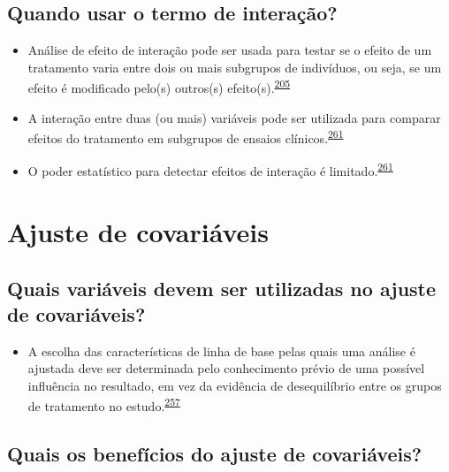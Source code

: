 \documentclass[
  a4paper,
]{book}
\providecommand{\tightlist}{%
  \setlength{\itemsep}{0pt}\setlength{\parskip}{0pt}}
\begin{document}
\hypertarget{quando-usar-o-termo-de-interauxe7uxe3o}{%
\subsection{Quando usar o termo de interação?}\label{quando-usar-o-termo-de-interauxe7uxe3o}}

\begin{itemize}
\item
  Análise de efeito de interação pode ser usada para testar se o efeito de um tratamento varia entre dois ou mais subgrupos de indivíduos, ou seja, se um efeito é modificado pelo(s) outros(s) efeito(s).\textsuperscript{\protect\hyperlink{ref-Altman1996}{205}}
\item
  A interação entre duas (ou mais) variáveis pode ser utilizada para comparar efeitos do tratamento em subgrupos de ensaios clínicos.\textsuperscript{\protect\hyperlink{ref-Altman2003}{261}}
\item
  O poder estatístico para detectar efeitos de interação é limitado.\textsuperscript{\protect\hyperlink{ref-Altman2003}{261}}
\end{itemize}

\hypertarget{ajuste-de-covariaveis}{%
\section{Ajuste de covariáveis}\label{ajuste-de-covariaveis}}

\hypertarget{quais-variuxe1veis-devem-ser-utilizadas-no-ajuste-de-covariuxe1veis}{%
\subsection{Quais variáveis devem ser utilizadas no ajuste de covariáveis?}\label{quais-variuxe1veis-devem-ser-utilizadas-no-ajuste-de-covariuxe1veis}}

\begin{itemize}
\tightlist
\item
  A escolha das características de linha de base pelas quais uma análise é ajustada deve ser determinada pelo conhecimento prévio de uma possível influência no resultado, em vez da evidência de desequilíbrio entre os grupos de tratamento no estudo.\textsuperscript{\protect\hyperlink{ref-roberts1999}{257}}
\end{itemize}

\hypertarget{quais-os-benefuxedcios-do-ajuste-de-covariuxe1veis}{%
\subsection{Quais os benefícios do ajuste de covariáveis?}\label{quais-os-benefuxedcios-do-ajuste-de-covariuxe1veis}}
\end{document}
